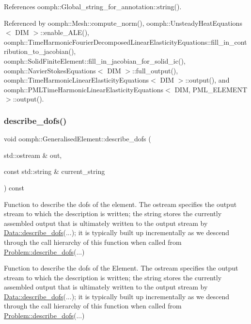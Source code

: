 References oomph\+::\+Global\+\_\+string\+\_\+for\+\_\+annotation\+::string().



Referenced by oomph\+::\+Mesh\+::compute\+\_\+norm(), oomph\+::\+Unsteady\+Heat\+Equations$<$ D\+I\+M $>$\+::enable\+\_\+\+A\+L\+E(), oomph\+::\+Time\+Harmonic\+Fourier\+Decomposed\+Linear\+Elasticity\+Equations\+::fill\+\_\+in\+\_\+contribution\+\_\+to\+\_\+jacobian(), oomph\+::\+Solid\+Finite\+Element\+::fill\+\_\+in\+\_\+jacobian\+\_\+for\+\_\+solid\+\_\+ic(), oomph\+::\+Navier\+Stokes\+Equations$<$ D\+I\+M $>$\+::full\+\_\+output(), oomph\+::\+Time\+Harmonic\+Linear\+Elasticity\+Equations$<$ D\+I\+M $>$\+::output(), and oomph\+::\+P\+M\+L\+Time\+Harmonic\+Linear\+Elasticity\+Equations$<$ D\+I\+M, P\+M\+L\+\_\+\+E\+L\+E\+M\+E\+N\+T $>$\+::output().

\mbox{\label{classoomph_1_1GeneralisedElement_ad66a4deee43225439b62e20c18accea7}} 
\subsubsection{\texorpdfstring{describe\+\_\+dofs()}{describe\_dofs()}}
{\footnotesize\ttfamily void oomph\+::\+Generalised\+Element\+::describe\+\_\+dofs (\begin{DoxyParamCaption}\item[{std\+::ostream \&}]{out,  }\item[{const std\+::string \&}]{current\+\_\+string }\end{DoxyParamCaption}) const}



Function to describe the dofs of the element. The ostream specifies the output stream to which the description is written; the string stores the currently assembled output that is ultimately written to the output stream by \hyperlink{classoomph_1_1Data_a2dae16e2dcff9a40029f834c83364df5}{Data\+::describe\+\_\+dofs}(...); it is typically built up incrementally as we descend through the call hierarchy of this function when called from \hyperlink{classoomph_1_1Problem_abc103804eb319ae0b3d43870cc3e1eaf}{Problem\+::describe\+\_\+dofs}(...) 

Function to describe the dofs of the Element. The ostream specifies the output stream to which the description is written; the string stores the currently assembled output that is ultimately written to the output stream by \hyperlink{classoomph_1_1Data_a2dae16e2dcff9a40029f834c83364df5}{Data\+::describe\+\_\+dofs}(...); it is typically built up incrementally as we descend through the call hierarchy of this function when called from \hyperlink{classoomph_1_1Problem_abc103804eb319ae0b3d43870cc3e1eaf}{Problem\+::describe\+\_\+dofs}(...) 

